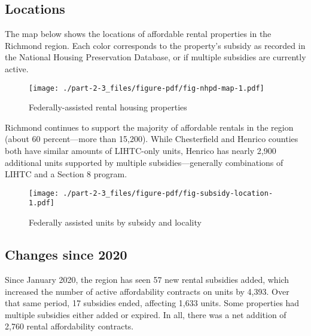 \documentclass[
  letterpaper,
  DIV=11,
  numbers=noendperiod]{scrreprt}
\begin{document}
\hypertarget{locations}{%
\subsection{Locations}\label{locations}}

The map below shows the locations of affordable rental properties in the
Richmond region. Each color corresponds to the property's subsidy as
recorded in the National Housing Preservation Database, or if multiple
subsidies are currently active.

\begin{figure}

{\centering \texttt{[image: ./part-2-3\_files/figure-pdf/fig-nhpd-map-1.pdf]}

}

\caption{\label{fig-nhpd-map}Federally-assisted rental housing
properties}

\end{figure}

Richmond continues to support the majority of affordable rentals in the
region (about 60 percent---more than 15,200). While Chesterfield and
Henrico counties both have similar amounts of LIHTC-only units, Henrico
has nearly 2,900 additional units supported by multiple
subsidies---generally combinations of LIHTC and a Section 8 program.

\begin{figure}

{\centering \texttt{[image: ./part-2-3\_files/figure-pdf/fig-subsidy-location-1.pdf]}

}

\caption{\label{fig-subsidy-location}Federally assisted units by subsidy
and locality}

\end{figure}

\hypertarget{changes-since-2020}{%
\subsection{Changes since 2020}\label{changes-since-2020}}

Since January 2020, the region has seen 57 new rental subsidies added,
which increased the number of active affordability contracts on units by
4,393. Over that same period, 17 subsidies ended, affecting 1,633 units.
Some properties had multiple subsidies either added or expired. In all,
there was a net addition of 2,760 rental affordability contracts.
\end{document}
